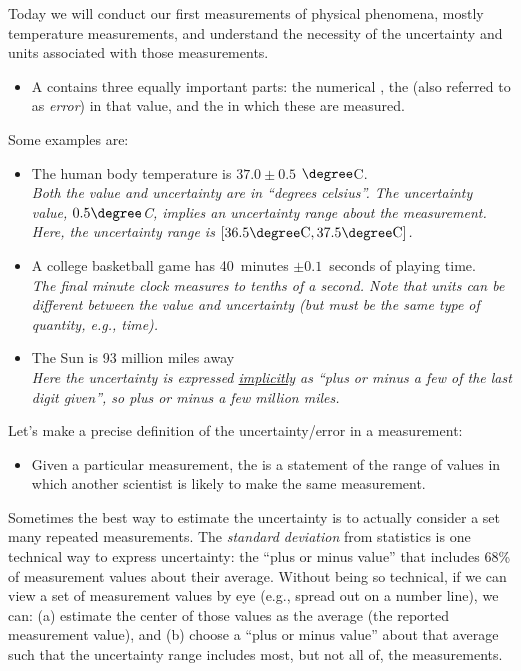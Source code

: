 Today we will conduct our first measurements of physical phenomena, mostly temperature measurements, and understand the necessity of the uncertainty and units associated with those measurements.
	\begin{itemize} 
	\item[] A  contains three equally important parts: the numerical , the  (also referred to as {\em error}) in that value, and the  in which these are measured.
	\end{itemize}
Some examples are:
	\begin{itemize}
	\item[-] The human body temperature is $37.0 \pm 0.5$ $\degree$C.\\
	{\small \em Both the value and uncertainty are in ``degrees celsius''. The uncertainty value, $0.5\degree$C, implies an uncertainty range about the measurement. Here, the uncertainty range is $[36.5\degree\text{C}, 37.5\degree\text{C}]$.}
	\item[-] A college basketball game has 40~minutes $\pm 0.1$~seconds of playing time.\\
	{\small \em The final minute clock measures to tenths of a second. Note that units can be different between the value and uncertainty (but must be the same type of quantity, e.g., time).}
	\item[-] The Sun is 93 million miles away\\
	{\small \em Here the uncertainty is expressed  \underline{implicitly} as ``plus or minus a few of the last digit given'', so plus or minus a few million miles.}
	\end{itemize}
Let's make a precise definition of the uncertainty/error in a measurement:
	\begin{itemize}
	\item[] Given a particular measurement, the  is a statement of the range of values in which another scientist is likely to make the same measurement.
	\end{itemize}
Sometimes the best way to estimate the uncertainty is to actually consider a set many repeated measurements.  The {\em standard deviation} from statistics is one technical way to express uncertainty: the ``plus or minus value'' that includes 68\% of measurement values about their average.  Without being so technical, if we can view a set of measurement values by eye (e.g., spread out on a number line), we can: (a) estimate the center of those values as the average (the reported measurement value), and (b) choose a ``plus or minus value'' about that average such that the uncertainty range includes most, but not all of, the measurements.\\

